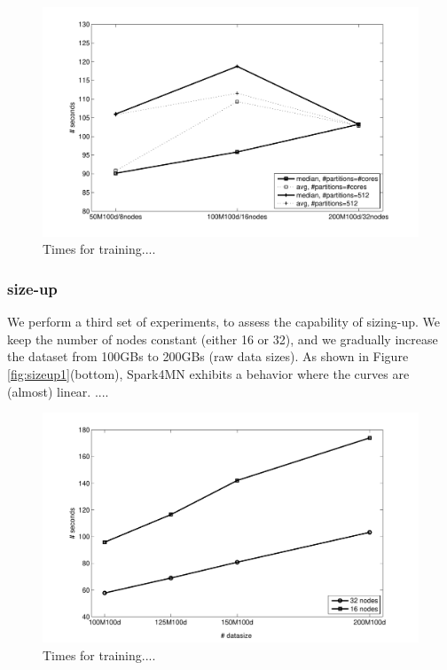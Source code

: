 \documentclass[journal]{IEEEtran}
\begin{document}
\begin{figure}[tb!]
\begin{center}
\centerline{\includegraphics[width=0.75\linewidth]{img/scaleup1.pdf}}
\caption{Times for training....}
\label{fig:speedup1}
\end{center}
\vspace{-0.5cm}
\end{figure}

\subsubsection{size-up} We perform a third set of experiments, to assess the capability of sizing-up. We keep the number of nodes constant (either 16 or 32), and we gradually increase the dataset from 100GBs to 200GBs (raw data sizes). As shown in Figure \ref{fig:sizeup1}(bottom), Spark4MN exhibits a behavior where the curves are (almost) linear. ....

\begin{figure}[tb!]
\begin{center}
\centerline{\includegraphics[width=0.75\linewidth]{img/sizeup1.pdf}}
\caption{Times for training....}
\label{fig:speedup1}
\end{center}
\vspace{-0.5cm}
\end{figure}
\end{document}
